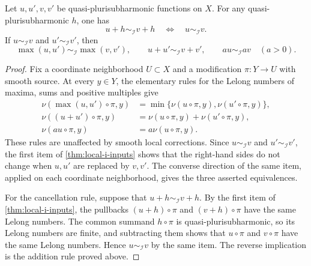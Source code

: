 \begin{lemma}\label{lem:hermitian-i-calculus}
Let $u,u',v,v'$ be quasi-plurisubharmonic functions on $X$. For any quasi-plurisubharmonic $h$, one has
\[
 u+h\sim_{\mathcal I}v+h
 \quad\Longleftrightarrow\quad u\sim_{\mathcal I}v.
\]
If $u\sim_{\mathcal I}v$ and $u'\sim_{\mathcal I}v'$, then
\[
 \max(u,u')\sim_{\mathcal I}\max(v,v'),\qquad
 u+u'\sim_{\mathcal I}v+v',\qquad
 a u\sim_{\mathcal I}a v\quad(a>0).
\]
\end{lemma}
\begin{proof}
Fix a coordinate neighborhood $U\subset X$ and a modification $\pi\colon Y\to U$ with smooth source. At every $y\in Y$, the elementary rules for the Lelong numbers of maxima, sums and positive multiples give
\[
 \begin{aligned}
 \nu(\max(u,u')\circ\pi,y)
   &=\min\{\nu(u\circ\pi,y),\nu(u'\circ\pi,y)\},\\
 \nu((u+u')\circ\pi,y)
   &=\nu(u\circ\pi,y)+\nu(u'\circ\pi,y),\\
 \nu(a u\circ\pi,y)&=a\nu(u\circ\pi,y).
 \end{aligned}
\]
These rules are unaffected by smooth local corrections. Since $u\sim_{\mathcal I}v$ and $u'\sim_{\mathcal I}v'$, the first item of \cref{thm:local-i-inputs} shows that the right-hand sides do not change when $u,u'$ are replaced by $v,v'$. The converse direction of the same item, applied on each coordinate neighborhood, gives the three asserted equivalences.

For the cancellation rule, suppose that $u+h\sim_{\mathcal I}v+h$. By the first item of \cref{thm:local-i-inputs}, the pullbacks $(u+h)\circ\pi$ and $(v+h)\circ\pi$ have the same Lelong numbers. The common summand $h\circ\pi$ is quasi-plurisubharmonic, so its Lelong numbers are finite, and subtracting them shows that $u\circ\pi$ and $v\circ\pi$ have the same Lelong numbers. Hence $u\sim_{\mathcal I}v$ by the same item. The reverse implication is the addition rule proved above.
\end{proof}



